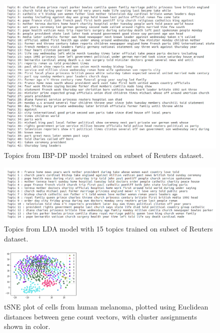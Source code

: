 \documentclass{article}
\begin{document}
\begin{figure}
    \centering
    \includegraphics[width=1\textwidth]{figs/ibptopics}
    \caption{Topics from IBP-DP model trained on subset of Reuters dataset.}
    \label{fig:ibptopics}
\end{figure}

\begin{figure}
    \centering
    \includegraphics[width=1\textwidth]{figs/ldatopics}
    \caption{Topics from LDA model with 15 topics trained on subset of Reuters dataset.}
    \label{fig:ldatopics}
\end{figure}

\begin{figure}
    \centering
    \includegraphics[width=0.35\textwidth]{figs/unclustered}
    \caption{tSNE plot of cells from human melanoma, plotted using Euclidean distances between gene count vectors, with cluster assignments shown in color.}
    \label{fig:unclustered}
\end{figure}
\end{document}
